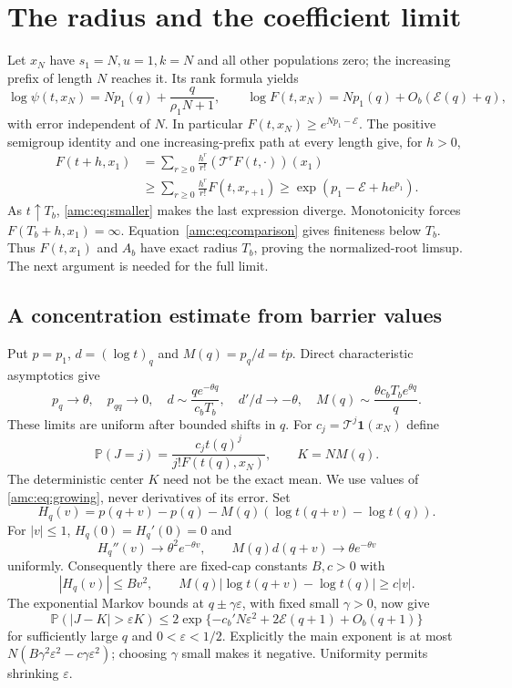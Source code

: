 \documentclass[11pt,letterpaper]{article}
\theoremstyle{remark}\newtheorem{remark}[theorem]{Remark}
\newcommand{\TT}{\mathcal T}
\newcommand{\one}{\mathbf 1}
\newcommand{\PP}{\mathbb P}
\newcommand{\Err}{\mathcal E}
\begin{document}
\section{The radius and the coefficient limit}\label{amc:sec:coefficients}
Let $x_N$ have $s_1=N,u=1,k=N$ and all other populations zero; the increasing prefix of length $N$ reaches it. Its rank formula yields
\begin{equation}\label{amc:eq:growing}
 \log\psi(t,x_N)=Np_1(q)+\frac q{\rho_1N+1},\qquad
 \log F(t,x_N)=Np_1(q)+O_b(\Err(q)+q),
\end{equation}
with error independent of $N$. In particular $F(t,x_N)\ge e^{Np_1-\Err}$.
The positive semigroup identity and one increasing-prefix path at every length give, for $h>0$,
\begin{align*}
 F(t+h,x_1)&=\sum_{r\ge0}\frac{h^r}{r!}(\TT^rF(t,\cdot))(x_1)\\
 &\ge\sum_{r\ge0}\frac{h^r}{r!}F(t,x_{r+1})
 \ge\exp(p_1-\Err+h e^{p_1}).
\end{align*}
As $t\uparrow T_b$, \eqref{amc:eq:smaller} makes the last expression diverge. Monotonicity forces $F(T_b+h,x_1)=\infty$. Equation~\eqref{amc:eq:comparison} gives finiteness below $T_b$. Thus $F(t,x_1)$ and $A_b$ have exact radius $T_b$, proving the normalized-root limsup. The next argument is needed for the full limit.

\subsection{A concentration estimate from barrier values}
Put $p=p_1$, $d=(\log t)_q$ and $M(q)=p_q/d=t\dot p$. Direct characteristic asymptotics give
\begin{equation}\label{amc:eq:M}
 p_q\to\theta,\quad p_{qq}\to0,\quad
 d\sim\frac{qe^{-\theta q}}{c_bT_b},\quad
 d'/d\to-\theta,\quad
 M(q)\sim\frac{\theta c_bT_b e^{\theta q}}q.
\end{equation}
These limits are uniform after bounded shifts in $q$. For $c_j=\TT^j\one(x_N)$ define
\[
 \PP(J=j)=\frac{c_jt(q)^j}{j!F(t(q),x_N)},\qquad K=NM(q).
\]
The deterministic center $K$ need not be the exact mean. We use values of \eqref{amc:eq:growing}, never derivatives of its error.
Set
\[
 H_q(v)=p(q+v)-p(q)-M(q)(\log t(q+v)-\log t(q)).
\]
For $|v|\le1$, $H_q(0)=H_q'(0)=0$ and
\[
 H_q''(v)\to\theta^2e^{-\theta v},\qquad
 M(q)d(q+v)\to\theta e^{-\theta v}
\]
uniformly. Consequently there are fixed-cap constants $B,c>0$ with
\[
 |H_q(v)|\le Bv^2,\qquad
 M(q)|\log t(q+v)-\log t(q)|\ge c|v|.
\]
The exponential Markov bounds at $q\pm\gamma\varepsilon$, with fixed small $\gamma>0$, now give
\begin{equation}\label{amc:eq:chernoff}
 \PP(|J-K|>\varepsilon K)
 \le2\exp\{-c_b' N\varepsilon^2+2\Err(q+1)+O_b(q+1)\}
\end{equation}
for sufficiently large $q$ and $0<\varepsilon<1/2$. Explicitly the main exponent is at most
$N(B\gamma^2\varepsilon^2-c\gamma\varepsilon^2)$; choosing $\gamma$ small makes it negative. Uniformity permits shrinking $\varepsilon$.
\end{document}
